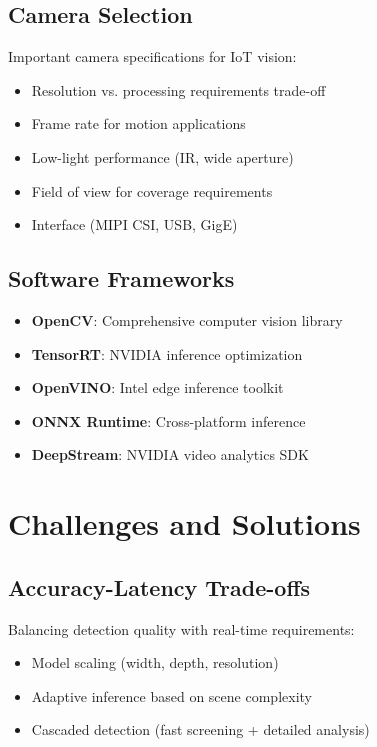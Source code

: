 \documentclass[12pt,a4paper]{article}
\begin{document}
\subsection{Camera Selection}

Important camera specifications for IoT vision:
\begin{itemize}
    \item Resolution vs. processing requirements trade-off
    \item Frame rate for motion applications
    \item Low-light performance (IR, wide aperture)
    \item Field of view for coverage requirements
    \item Interface (MIPI CSI, USB, GigE)
\end{itemize}

\subsection{Software Frameworks}

\begin{itemize}
    \item \textbf{OpenCV}: Comprehensive computer vision library
    \item \textbf{TensorRT}: NVIDIA inference optimization
    \item \textbf{OpenVINO}: Intel edge inference toolkit
    \item \textbf{ONNX Runtime}: Cross-platform inference
    \item \textbf{DeepStream}: NVIDIA video analytics SDK
\end{itemize}

\section{Challenges and Solutions}

\subsection{Accuracy-Latency Trade-offs}

Balancing detection quality with real-time requirements:
\begin{itemize}
    \item Model scaling (width, depth, resolution)
    \item Adaptive inference based on scene complexity
    \item Cascaded detection (fast screening + detailed analysis)
\end{itemize}
\end{document}
